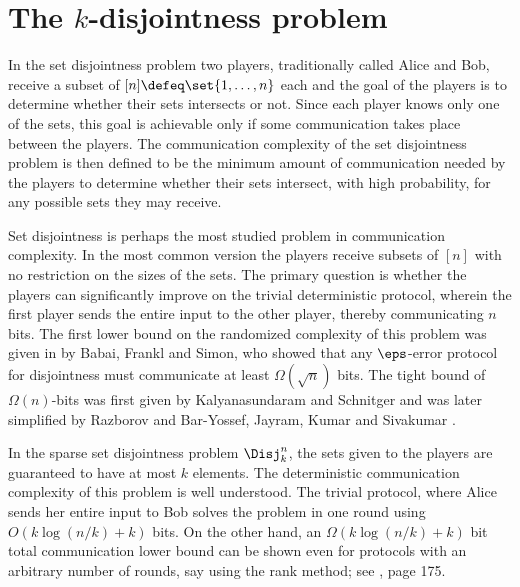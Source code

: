 \chapter{The $k$-disjointness problem}
\label{sec:ham}

\label{sec:ham:intro}
In the set disjointness problem two players, traditionally
called Alice and Bob, receive a subset of
$[n]\defeq\set{1,\ldots,n}$ each and the goal of the players is
to determine whether their sets intersects or not. Since each
player knows only one of the sets, this goal is achievable only
if some communication takes place between the players. The
communication complexity of the set disjointness problem is then
defined to be the minimum amount of communication needed by the
players to determine whether their sets intersect, with high
probability, for any possible sets they may receive. 

Set disjointness is perhaps the most studied problem in
communication complexity. In the most common version
the players receive subsets of $[n]$ with no restriction
on the sizes of the sets. The primary question is
whether the players can significantly improve on the trivial
deterministic protocol, wherein the first player sends the
entire input to the other player, thereby communicating $n$
bits. The first lower bound on the randomized complexity of this
problem was given in \cite{BabaiFS1986} by Babai, Frankl and
Simon, who showed that any $\eps$-error protocol for
disjointness must communicate at least $\Omega(\sqrt{n})$ bits.
The tight bound of $\Omega(n)$-bits was first given by
Kalyanasundaram and Schnitger \cite{KalyanasundaramS1992} and
was later simplified by Razborov \cite{Razborov1992} and
Bar-Yossef, Jayram, Kumar and Sivakumar
\cite{Bar-YossefJKS2004}.

In the sparse set disjointness problem $\Disj_k^n$, the sets
given to the players are guaranteed to have at most $k$
elements. The deterministic communication complexity of this
problem is well understood. The trivial protocol, where Alice
sends her entire input to Bob solves the problem in one round
using $O(k\log(n/k) + k)$ bits. On the other hand, an
$\Omega(k\log(n/k) + k)$ bit total communication lower bound can be
shown even for protocols with an arbitrary number of rounds, say
using the rank method; see \cite{KushilevitzN1997}, page 175.

